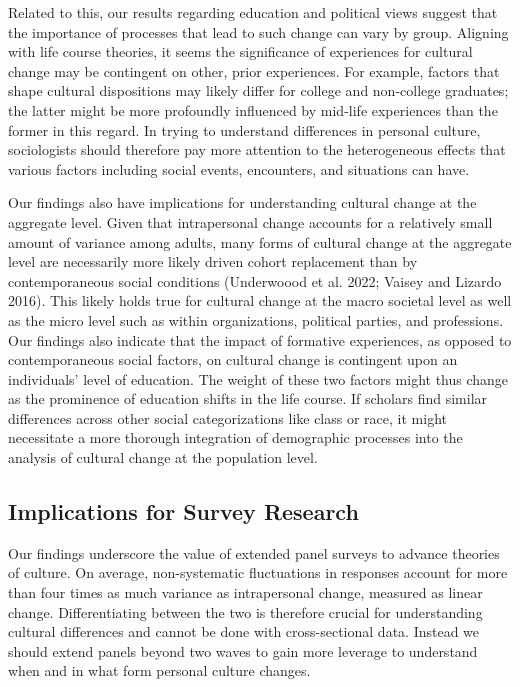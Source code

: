 \documentclass[
  12pt,
]{article}
\begin{document}
Related to this, our results regarding education and political views
suggest that the importance of processes that lead to such change can
vary by group. Aligning with life course theories, it seems the
significance of experiences for cultural change may be contingent on
other, prior experiences. For example, factors that shape cultural
dispositions may likely differ for college and non-college graduates;
the latter might be more profoundly influenced by mid-life experiences
than the former in this regard. In trying to understand differences in
personal culture, sociologists should therefore pay more attention to
the heterogeneous effects that various factors including social events,
encounters, and situations can have.

Our findings also have implications for understanding cultural change at
the aggregate level. Given that intrapersonal change accounts for a
relatively small amount of variance among adults, many forms of cultural
change at the aggregate level are necessarily more likely driven cohort
replacement than by contemporaneous social conditions (Underwoood et al.
2022; Vaisey and Lizardo 2016). This likely holds true for cultural
change at the macro societal level as well as the micro level such as
within organizations, political parties, and professions. Our findings
also indicate that the impact of formative experiences, as opposed to
contemporaneous social factors, on cultural change is contingent upon an
individuals' level of education. The weight of these two factors might
thus change as the prominence of education shifts in the life course. If
scholars find similar differences across other social categorizations
like class or race, it might necessitate a more thorough integration of
demographic processes into the analysis of cultural change at the
population level.

\hypertarget{implications-for-survey-research}{%
\subsection{Implications for Survey
Research}\label{implications-for-survey-research}}

Our findings underscore the value of extended panel surveys to advance
theories of culture. On average, non-systematic fluctuations in
responses account for more than four times as much variance as
intrapersonal change, measured as linear change. Differentiating between
the two is therefore crucial for understanding cultural differences and
cannot be done with cross-sectional data. Instead we should extend
panels beyond two waves to gain more leverage to understand when and in
what form personal culture changes.
\end{document}
